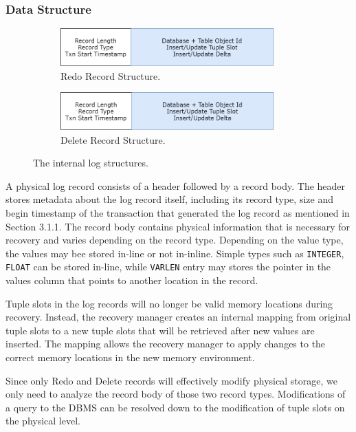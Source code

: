 \documentclass[12pt]{cmuthesis}
\begin{document}
\subsubsection{Data Structure}
\begin{figure}[H]
\centering
\begin{subfigure}{.5\textwidth}
 \centering
 \includegraphics[width=0.9\textwidth]{images/RedoRecord.png}
 \caption{Redo Record Structure.}
  \label{fig:pipeline_graph}
\end{subfigure}%
\begin{subfigure}{.5\textwidth}
 \centering
 \includegraphics[width=0.9\textwidth]{images/DeleteRecord.png}
 \caption{Delete Record Structure.}
  \label{fig:pipeline_code}
\end{subfigure}
\caption{The internal log structures.}
\label{fig:log_record}
\end{figure}

A physical log record consists of a header followed by a record body. The header stores metadata about the log record itself, including its record type, size and begin timestamp of the transaction that generated the log record as mentioned in Section 3.1.1. The record body contains physical information that is necessary for recovery and varies depending on the record type. Depending on the value type, the values may bee stored in-line or not in-inline. Simple types such as \texttt{INTEGER}, \texttt{FLOAT} can be stored in-line, while \texttt{VARLEN} entry may stores the pointer in the values column that points to another location in the record.

Tuple slots in the log records will no longer be valid memory locations during recovery. Instead, the recovery manager creates an internal mapping from original tuple slots to a new tuple slots that will be retrieved after new values are inserted. The mapping allows the recovery manager to apply changes to the correct memory locations in the new memory environment.

Since only Redo and Delete records will effectively modify physical storage, we only need to analyze the record body of those two record types. Modifications of a query to the DBMS can be resolved down to the modification of tuple slots on the physical level.
\end{document}
